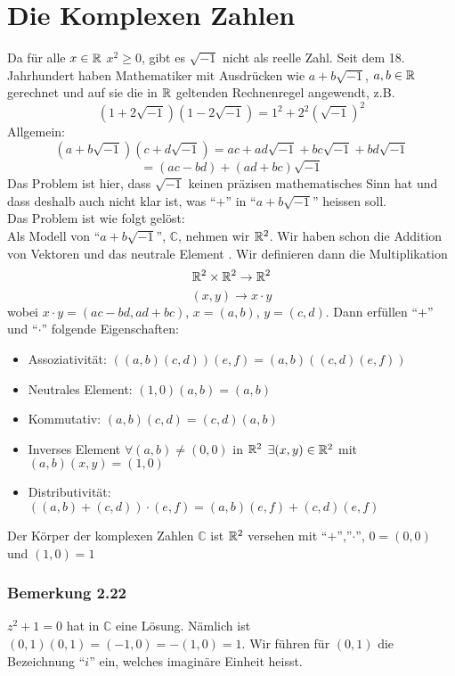 \section{Die Komplexen Zahlen}
Da für alle $x\in\mathbb{R}$ $x^2\geq 0$, gibt es $\sqrt{-1}$ nicht als reelle Zahl. Seit dem 18. Jahrhundert haben Mathematiker mit Ausdrücken wie $a+b\sqrt{-1}$, $a,b\in\mathbb{R}$ gerechnet und auf sie die in $\mathbb{R}$ geltenden Rechnenregel angewendt, z.B. \[\left( 1+2\sqrt{-1}\right)\left( 1-2\sqrt{-1}\right) = 1^2 + 2^2\left( \sqrt{-1}\right)^2\]
Allgemein:
\[\left( a+b\sqrt{-1} \right)\left( c+d\sqrt{-1}\right) = ac + ad\sqrt{-1} + bc\sqrt{-1}+bd\sqrt{-1}\]
\[=\left( ac-bd\right)+\left(ad+bc\right)\sqrt{-1}\]
Das Problem ist hier, dass $\sqrt{-1}$ keinen präzisen mathematisches Sinn hat und dass deshalb auch nicht klar ist, was ``$+$'' in ``$a+b\sqrt{-1}$'' heissen soll. \\

\noindent Das Problem ist wie folgt gelöst:\\

Als Modell von ``$a+b\sqrt{-1}$'', $\mathbb{C}$, nehmen wir $\mathbb{R}^2$. Wir haben schon die Addition von Vektoren und das neutrale Element . Wir definieren dann die Multiplikation \[\mathbb{R}^2 \times\mathbb{R}^2 \to \mathbb{R}^2\] \[(x,y)\to x\cdot y \]
wobei $x\cdot y=(ac-bd,ad+bc)$, $x=(a,b)$, $y=(c,d)$. Dann erfüllen ``$+$'' und ``$\cdot$'' folgende Eigenschaften:
\begin{itemize}
\item Assoziativität: $\left((a,b)(c,d)\right)(e,f)=(a,b)\left((c,d)(e,f) \right)$
\item Neutrales Element: $(1,0)(a,b)=(a,b)$
\item Kommutativ: $(a,b)(c,d)=(c,d)(a,b)$
\item Inverses Element $\forall (a,b)\not = (0,0)$ in $\mathbb{R}^2$ $\exists(x,y)\in\mathbb{R}^2$ mit $(a,b)(x,y)=(1,0)$
\item Distributivität: $\left( (a,b)+(c,d)\right)\cdot (e,f)=(a,b)(e,f)+(c,d)(e,f)$
\end{itemize}

\begin{definition}{2.21}
Der Körper der komplexen Zahlen $\mathbb{C}$ ist $\mathbb{R}^2$ versehen mit ``$+$'',''$\cdot$'', $0=(0,0)$ und $(1,0)=1$
\end{definition}

\subsubsection*{Bemerkung 2.22}
$z^2+1=0$ hat in $\mathbb{C}$ eine Lösung. Nämlich ist $(0,1)(0,1)=(-1,0)=-(1,0)=1$. Wir führen für $(0,1)$ die Bezeichnung ``$i$'' ein, welches imaginäre Einheit heisst.\\

